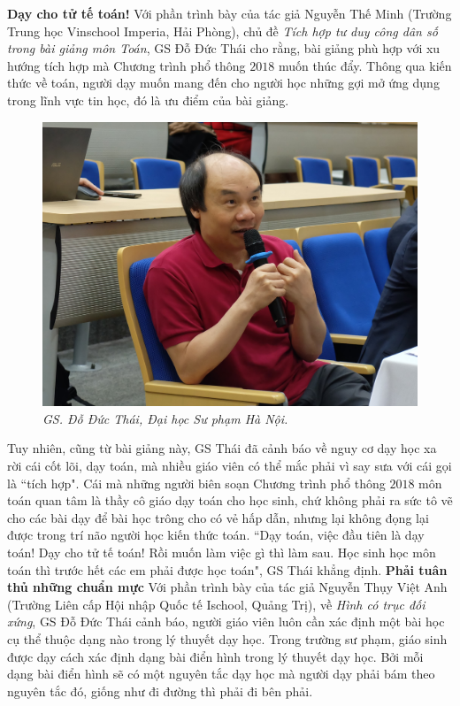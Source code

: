 \begin{multicols}{2}
	\vskip 0.1cm
	\textbf{\color{diendantoanhoc}Dạy cho tử tế toán!}
	\vskip 0.1cm
	Với phần trình bày của tác giả Nguyễn Thế Minh (Trường Trung học Vinschool Imperia, Hải Phòng), chủ đề \textit{Tích hợp tư duy công dân số trong bài giảng môn Toán}, GS Đỗ Đức Thái cho rằng, bài giảng phù hợp với xu hướng tích hợp mà Chương trình phổ thông $2018$ muốn thúc đẩy. Thông qua kiến thức về toán, người dạy muốn mang đến cho người học những gợi mở ứng dụng trong lĩnh vực tin học, đó là ưu điểm của bài giảng. 
	\begin{figure}[H]
		\vspace*{-5pt}
		\centering
		\captionsetup{labelformat= empty, justification=centering}
		\includegraphics[width= 1\linewidth]{1.1}
		\caption{\small\textit{\color{diendantoanhoc}GS. Đỗ Đức Thái, Đại học Sư phạm Hà Nội.}}
		\vspace*{-10pt}
	\end{figure}
	Tuy nhiên, cũng từ bài giảng này, GS Thái đã cảnh báo về nguy cơ dạy học xa rời cái cốt lõi, dạy toán, mà nhiều giáo viên có thể mắc phải vì say sưa với cái gọi là ``tích hợp". Cái mà những người biên soạn Chương trình phổ thông $2018$ môn toán quan tâm là thầy cô giáo dạy toán cho học sinh, chứ không phải ra sức tô vẽ cho các bài dạy để bài học trông cho có vẻ hấp dẫn, nhưng lại không đọng lại được trong trí não người học kiến thức toán. ``Dạy toán, việc đầu tiên là dạy toán! Dạy cho tử tế toán! Rồi muốn làm việc gì thì làm sau. Học sinh học môn toán thì trước hết các em phải được học toán", GS Thái khẳng định. 
	\vskip 0.1cm
	\textbf{\color{diendantoanhoc}Phải tuân thủ những chuẩn mực} 
	\vskip 0.1cm
	Với phần trình bày của tác giả Nguyễn Thụy Việt Anh (Trường Liên cấp Hội nhập Quốc tế Ischool, Quảng Trị), về \textit{Hình có trục đối xứng}, GS Đỗ Đức Thái cảnh báo, người giáo viên luôn cần xác định một bài học cụ thể thuộc dạng nào trong lý thuyết dạy học. Trong trường sư phạm, giáo sinh được dạy cách xác định dạng bài điển hình trong lý thuyết dạy học. Bởi mỗi dạng bài điển hình sẽ có một nguyên tắc dạy học mà người dạy phải bám theo nguyên tắc đó, giống như đi đường thì phải đi bên phải.  

\end{multicols}
